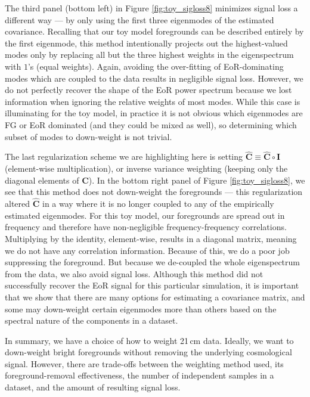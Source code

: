 \documentclass[preprint2,numberedappendix,tighten]{aastex6}
\begin{document}
The third panel (bottom left) in Figure \ref{fig:toy_sigloss8} minimizes signal loss a different way --- 
by only using the first three eigenmodes of the estimated covariance. Recalling that our toy model foregrounds can be described entirely by the first eigenmode, this 
method intentionally projects out the highest-valued modes only by replacing all but the three highest weights in the 
eigenspectrum with $1$'s (equal weights). Again, avoiding the over-fitting of EoR-dominating modes which are coupled to the data results in negligible signal loss. However, we do 
not perfectly recover the shape of the EoR power spectrum because we lost information when ignoring the relative weights of most modes. While this case is illuminating for the toy model, in practice it is not obvious which eigenmodes are FG or EoR dominated (and they could be mixed as well), so determining which subset of modes to down-weight is not trivial. 

The last regularization scheme we are highlighting here is setting $\widehat{\textbf{C}} \equiv \widehat{\textbf{C}} \circ \textbf{I}$ (element-wise multiplication), or inverse variance weighting (keeping only the diagonal elements of $\widehat{\textbf{C}}$). In the bottom right 
panel of Figure \ref{fig:toy_sigloss8}, we see that this method does not down-weight the foregrounds --- this regularization altered $\widehat{\textbf{C}}$ in a way where it is no longer coupled to any of the empirically estimated eigenmodes. For this toy model, 
our foregrounds are spread out in frequency and therefore have non-negligible frequency-frequency correlations. Multiplying by 
the identity, element-wise, results in a diagonal matrix, meaning we do not have any correlation information. Because of this, we do a poor job 
suppressing the foreground. But because we de-coupled the whole eigenspectrum from the data, we also avoid signal loss. Although this method did not successfully recover the EoR signal for this particular simulation, it is important that we show that there 
are many options for estimating a covariance matrix, and some may down-weight certain eigenmodes more than others based on the spectral nature 
of the components in a dataset. 

In summary, we have a choice of how to weight 21\,cm data. Ideally, we want to down-weight bright foregrounds without 
removing the underlying cosmological signal. However, there are trade-offs between the weighting method 
used, its foreground-removal effectiveness, the number of independent samples in a dataset, and the amount of resulting signal loss. 
\end{document}
